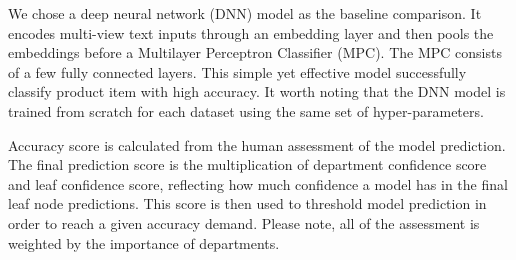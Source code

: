 \documentclass[11pt,dvipsnames]{article}
\begin{document}

We chose a deep neural network (DNN) model as the baseline comparison. It encodes multi-view text inputs through an embedding layer and then pools the embeddings before a Multilayer Perceptron Classifier (MPC). The MPC consists of a few fully connected layers. This simple yet effective model successfully classify product item with high accuracy. It worth noting that the DNN model is trained from scratch for each dataset using the same set of hyper-parameters.   

Accuracy score is calculated from the human assessment of the model prediction. The final prediction score is the multiplication of department confidence score and leaf confidence score, reflecting how much confidence a model has in the final leaf node predictions. This score is then used to threshold model prediction in order to reach a given accuracy demand. Please note, all of the assessment is weighted by the importance of departments.
\end{document}
